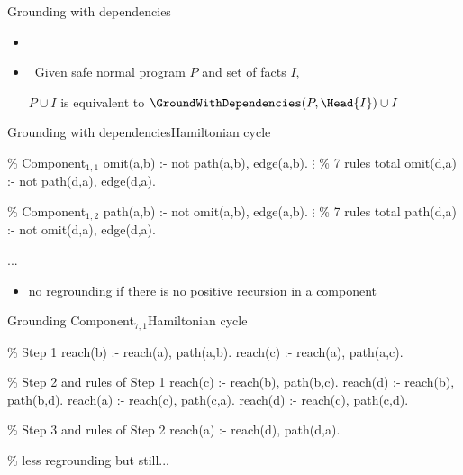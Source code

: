 \begin{frame}{Grounding with dependencies}
  \bigskip
  \begin{itemize}
  \item []


  \bigskip
  \item<2->  \ Given safe normal program \(P\) and set of facts \(I\),

    \(P \cup I\) is equivalent to \(\GroundWithDependencies(P,\Head{I}) \cup I\)
  \end{itemize}
\end{frame}
\begin{frame}{Grounding with dependencies}{Hamiltonian cycle}
\begin{SemiVerbatim}{.9}
{\color{comment}\% Component\(_{1,1}\)}
omit(a,b) :- not path(a,b), \alert{edge(a,b)}.
          \(\vdots\) {\color{comment}\% 7 rules total}
omit(d,a) :- not path(d,a), \alert{edge(d,a)}.

{\color{comment}\% Component\(_{1,2}\)}
path(a,b) :- not omit(a,b), \alert{edge(a,b)}.
          \(\vdots\) {\color{comment}\% 7 rules total}
path(d,a) :- not omit(d,a), \alert{edge(d,a)}.

...
\end{SemiVerbatim}
\vspace{-.8cm}
\begin{itemize}
  \item no regrounding if there is no positive recursion in a component
\end{itemize}
\end{frame}
\begin{frame}{Grounding Component\(_{7,1}\)}{Hamiltonian cycle}
\begin{SemiVerbatim}{.9}
{\color{comment}\% Step 1}
reach(b) :- \alert{reach(a)}, \alert{path(a,b)}.
reach(c) :- \alert{reach(a)}, \alert{path(a,c)}.

{\color{comment}\% Step 2 \alert{and} rules of Step 1}
reach(c) :- \alert{reach(b)}, path(b,c).
reach(d) :- \alert{reach(b)}, path(b,d).
reach(a) :- \alert{reach(c)}, path(c,a).
reach(d) :- \alert{reach(c)}, path(c,d).

{\color{comment}\% Step 3 \alert{and} rules of Step 2}
reach(a) :- \alert{reach(d)}, path(d,a).

{\color{comment}\% less regrounding but still...}
\end{SemiVerbatim}
\end{frame}


